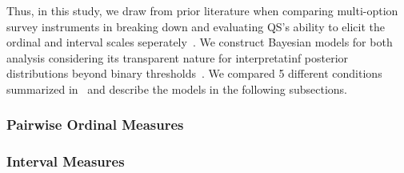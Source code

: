 Thus, in this study, we draw from prior literature when comparing multi-option survey instruments in breaking down and evaluating QS's ability to elicit the ordinal and interval scales seperately~\cite{collewetPreferenceEstimationPoint2023}. We construct Bayesian models for both analysis considering its transparent nature for interpretatinf posterior distributions beyond binary thresholds~\cite{mcelreath2018statistical, kay2016researcher}. We compared 5 different conditions summarized in~ and describe the models in the following subsections.



\subsubsection{Pairwise Ordinal Measures}
\label{sec:ordinal_measures}


\subsubsection{Interval Measures}
\label{sec:interval_measures}

